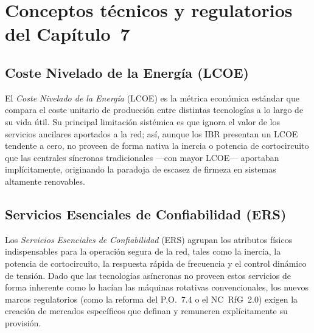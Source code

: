 
\chapter{Conceptos técnicos y regulatorios del Capítulo~7}
\label{anexo:conceptos_cap7}

\section{Coste Nivelado de la Energía (LCOE)}
\label{anexo:lcoe}
El \textit{Coste Nivelado de la Energía} (LCOE) es la métrica económica
estándar que compara el coste unitario de producción entre distintas
tecnologías a lo largo de su vida útil. Su principal limitación sistémica
es que ignora el valor de los servicios ancilares aportados a la red;
así, aunque los IBR presentan un LCOE tendente a cero, no proveen de
forma nativa la inercia o potencia de cortocircuito que las centrales
síncronas tradicionales ---con mayor LCOE--- aportaban implícitamente,
originando la paradoja de escasez de firmeza en sistemas altamente
renovables.

\section{Servicios Esenciales de Confiabilidad (ERS)}
\label{anexo:ers}
Los \textit{Servicios Esenciales de Confiabilidad} (ERS) agrupan los
atributos físicos indispensables para la operación segura de la red,
tales como la inercia, la potencia de cortocircuito, la respuesta rápida
de frecuencia y el control dinámico de tensión. Dado que las tecnologías
asíncronas no proveen estos servicios de forma inherente como lo hacían
las máquinas rotativas convencionales, los nuevos marcos regulatorios
(como la reforma del P.O.~7.4 o el NC~RfG~2.0) exigen la creación de
mercados específicos que definan y remuneren explícitamente su provisión.

